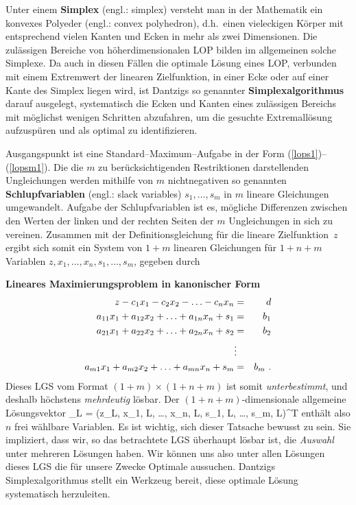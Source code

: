 \medskip
\noindent
Unter einem {\bf Simplex} (engl.: simplex) versteht man in der 
Mathematik ein konvexes Polyeder (engl.: convex polyhedron), d.h.\ 
einen vieleckigen K\"orper mit
entsprechend vielen Kanten und Ecken in mehr als zwei Dimensionen.
Die zul\"assigen Bereiche von h\"oherdimensionalen LOP bilden
im allgemeinen solche Simplexe. Da auch in diesen F\"allen die
optimale L\"osung eines LOP, verbunden mit einem Extremwert der
linearen Zielfunktion, in einer Ecke oder auf einer Kante
des Simplex liegen wird, ist Dantzigs so genannter
{\bf Simplexalgorithmus} darauf ausgelegt, systematisch die
Ecken und Kanten eines zul\"assigen Bereichs mit m\"oglichst
wenigen Schritten abzufahren, um die gesuchte Extremall\"osung
aufzusp\"uren und als optimal zu identifizieren.

\medskip
\noindent
Ausgangspunkt ist eine Standard--Maximum--Aufgabe in der Form
(\ref{lops1})--(\ref{lopsm1}). Die die $m$ zu ber\"ucksichtigenden
Restriktionen darstellenden Ungleichungen werden mithilfe von
$m$ nichtnegativen so genannten {\bf Schlupfvariablen} (engl.: 
slack variables) $s_{1}, \ldots, s_{m}$ in $m$ lineare Gleichungen 
umgewandelt.
Aufgabe der Schlupfvariablen ist es, m\"ogliche Differenzen
zwischen den Werten der linken und der rechten Seiten der $m$
Ungleichungen in sich zu vereinen. Zusammen mit der
Definitionsgleichung f\"ur die lineare Zielfunktion~$z$
ergibt sich somit ein System von $1+m$ linearen Gleichungen
f\"ur $1+n+m$ Variablen $z, x_{1},
\ldots, x_{n}, s_{1}, \ldots, s_{m}$, gegeben durch

\medskip
\noindent
{\bf Lineares Maximierungsproblem in kanonischer Form}
\nopagebreak
%
\begin{eqnarray}
\lb{lopk1}
z - c_{1}x_{1} - c_{2}x_{2} - \ldots - c_{n}x_{n} & = & d \\
%
a_{11}x_{1} + a_{12}x_{2} + \ldots + a_{1n}x_{n} + s_{1} & = & b_{1} \\
%
a_{21}x_{1} + a_{22}x_{2} + \ldots + a_{2n}x_{n} + s_{2} & = & b_{2} \\
%
 & \vdots & \nonumber \\
%
\lb{lopkm1}
a_{m1}x_{1} + a_{m2}x_{2} + \ldots + a_{mn}x_{n} + s_{m} & = & b_{m} \ .
\end{eqnarray}
%
Dieses LGS vom Format $(1+m) \times (1+n+m)$ ist somit
{\em unterbestimmt\/}, und deshalb h\"ochstens
{\em mehrdeutig\/} l\"osbar. Der $(1+n+m)$-dimensionale
allgemeine L\"osungsvektor
%
\be
{}_{L} = \left(z_{L}, x_{1, L}, \ldots, x_{n, L},
s_{1, L}, \ldots, s_{m, L}\right)^{T}
\ee
%
enth\"alt also $n$ frei w\"ahlbare Variablen.
Es ist wichtig, sich dieser Tatsache bewusst zu sein.
Sie impliziert, dass wir, so das betrachtete LGS \"uberhaupt
l\"osbar ist, die {\em Auswahl\/} unter mehreren L\"osungen
haben. Wir k\"onnen uns also unter allen L\"osungen dieses LGS
die f\"ur unsere Zwecke Optimale aussuchen. Dantzigs
Simplexalgorithmus stellt ein Werkzeug bereit, diese optimale
L\"osung systematisch herzuleiten.

